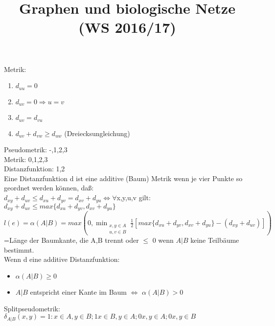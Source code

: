 \documentclass[12pt,a4paper]{article}
\title{\Huge\textbf{Graphen und biologische Netze (WS 2016/17)}}
\author{}
\date{}
\begin{document}
\begin{titlepage}

\maketitle
\thispagestyle{empty}
\end{titlepage}
\newpage

\begin{titlepage}
\tableofcontents
\thispagestyle{empty}
\end{titlepage}

Metrik:
\begin{enumerate}
	\item $d_{uu}=0$
	\item $d_{uv}=0 \Rightarrow u=v$
	\item $d_{uv}=d_{vu}$
	\item $d_{uv} + d_{vw} \geq d_{uw}$ (Dreiecksungleichung)
\end{enumerate}

Pseudometrik: -,1,2,3\\
Metrik: 0,1,2,3\\
Distanzfunktion: 1,2\\

Eine Distanzfunktion d ist eine additive (Baum) Metrik wenn je vier Punkte so geordnet werden können, daß:\\
$d_{xy} + d_{uv} \leq d_{xu} + d_{yv} = d_{xv} + d_{yu} \Leftrightarrow \forall$x,y,u,v gilt:\\
$d_{xy} + d_{uv} \leq max\{d_{xu} + d_{yv}, d_{xv} + d_{yu}\}$\\

$l(e)=\alpha(A|B)=max(0, \displaystyle\min_{\substack{x,y \in A \\ u,v \in B}} \frac{1}{2}[max\{d_{xu} + d_{yv}, d_{xv} + d_{yu}\} - (d_{xy} + d_{uv})])$\\
=Länge der Baumkante, die A,B trennt oder $\leq$ 0 wenn $A|B$ keine Teilbäume bestimmt.\\
Wenn d eine additive Distanzfunktion:
\begin{itemize}
	\item $\alpha (A|B)\geq 0$
	\item $A|B$ entspricht einer Kante im Baum $\Leftrightarrow$ $\alpha (A|B) > 0$
\end{itemize}

Splitpseudometrik:\\
$\delta_{A|B}(x,y)=1:x\in A, y \in B; 1 x\in B, y \in A; 0 x,y \in A; 0 x,y \in B$\\
\end{document}
